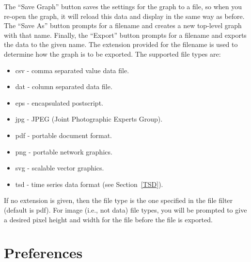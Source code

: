 \documentclass[titlepage,11pt]{article}
\begin{document}
The ``Save Graph'' button saves the settings for the graph to 
a file, so when you re-open the graph, it will reload this data and display 
in the same way as before.  The ``Save As'' button prompts for a 
filename and creates a new top-level graph with that name.  
Finally, the ``Export'' button prompts for a filename and exports
the data to the given name.  The extension provided for the filename 
is used to determine how the graph is to be exported. The
supported file types are: 
\begin{itemize}
\item csv - comma separated value data file. 
\item dat - column separated data file. 
\item eps - encapsulated postscript. 
\item jpg - JPEG (Joint Photographic Experts Group). 
\item pdf - portable document format.
\item png - portable network graphics. 
\item svg - scalable vector graphics.
\item tsd - time series data format (see Section~\ref{TSD}).
\end{itemize}
If no extension is given, then the file type is the one
specified in the file filter (default is pdf).  For image (i.e.,
not data) file types, you will be prompted to give a desired
pixel height and width for the file before the file is exported. 

\section{\label{Preferences}Preferences}
\end{document}
